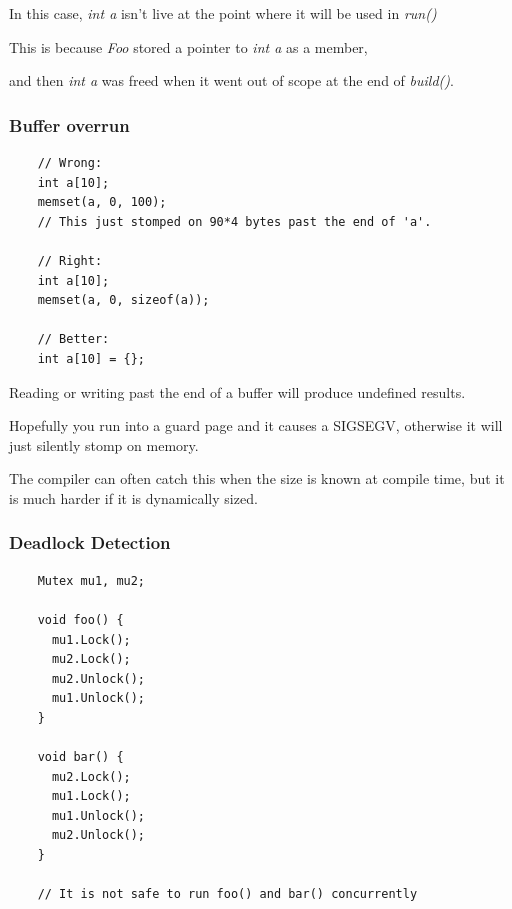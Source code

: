 \documentclass{article}
\begin{document}
In this case, \textit{int a} isn't live at the point where it will be used in \textit{run()}

\vspace*{1em}

This is because \textit{Foo} stored a pointer to \textit{int a} as a member,

and then \textit{int a} was freed when it went out of scope at the end of \textit{build()}.

\subsubsection{Buffer overrun}

\begin{verbatim}
    // Wrong:
    int a[10];
    memset(a, 0, 100);
    // This just stomped on 90*4 bytes past the end of 'a'.
    
    // Right:
    int a[10];
    memset(a, 0, sizeof(a));

    // Better:
    int a[10] = {};

\end{verbatim}

Reading or writing past the end of a buffer will produce undefined results.

\vspace*{1em}

Hopefully you run into a guard page and it causes a SIGSEGV, otherwise it will just silently stomp on memory. 

\vspace*{0.5em}

The compiler can often catch this when the size is known at compile time, but it is much harder if it is dynamically sized.

\subsubsection{Deadlock Detection}

\begin{verbatim}
    Mutex mu1, mu2;

    void foo() {
      mu1.Lock();
      mu2.Lock();
      mu2.Unlock();
      mu1.Unlock();
    }
    
    void bar() {
      mu2.Lock();
      mu1.Lock();
      mu1.Unlock();
      mu2.Unlock();
    }
    
    // It is not safe to run foo() and bar() concurrently    
\end{verbatim}
\end{document}
